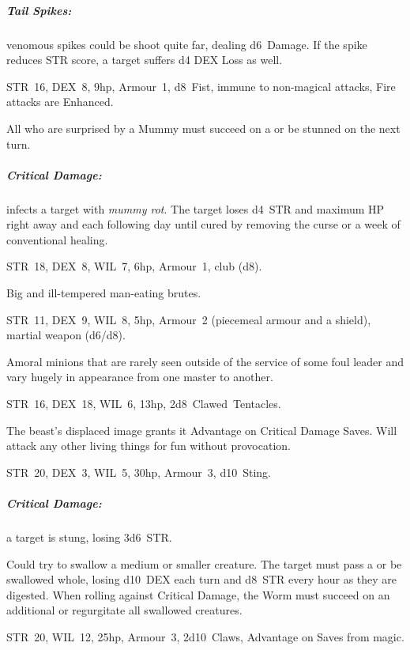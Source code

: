 \documentclass[itdr]{subfiles}
\begin{document}
\subparagraph{Tail Spikes:} venomous spikes could be shoot quite far, dealing d6~Damage. If the spike reduces STR score, a target suffers d4 DEX Loss as well.

\vfill

STR~16, DEX~8, 9hp, Armour~1, d8~Fist, immune to non-magical attacks, Fire attacks are Enhanced.

All who are surprised by a Mummy must succeed on a  or be stunned on the next turn.

\subparagraph{Critical Damage:} infects a target with {\em mummy rot}. The target loses d4~STR and maximum HP right away and each following day until cured by removing the curse or a week of conventional healing.

\vfill

STR~18, DEX~8, WIL~7, 6hp, Armour~1, club (d8).

Big and ill-tempered man-eating brutes.

\vfill

STR~11, DEX~9, WIL~8, 5hp, Armour~2 (piecemeal armour and a shield), martial weapon (d6/d8).

Amoral minions that are rarely seen outside of the service of some foul leader and vary hugely in appearance from one master to another.

\vfill

STR~16, DEX~18, WIL~6, 13hp, 2d8~Clawed~Tentacles.

The beast's displaced image grants it Advantage on Critical Damage Saves. Will attack any other living things for fun without provocation.

\vfill
\break

\vfill
{}

STR~20, DEX~3, WIL~5, 30hp, Armour~3, d10~Sting.

\subparagraph{Critical Damage:} a target is stung, losing 3d6~STR.

Could try to swallow a medium or smaller creature. The target must pass a  or be swallowed whole, losing d10~DEX each turn and d8~STR every hour as they are digested. When rolling against Critical Damage, the Worm must succeed on an additional  or regurgitate all swallowed creatures.

\vfill

STR~20, WIL~12, 25hp, Armour~3, 2d10~Claws, Advantage on Saves from magic.
\end{document}
